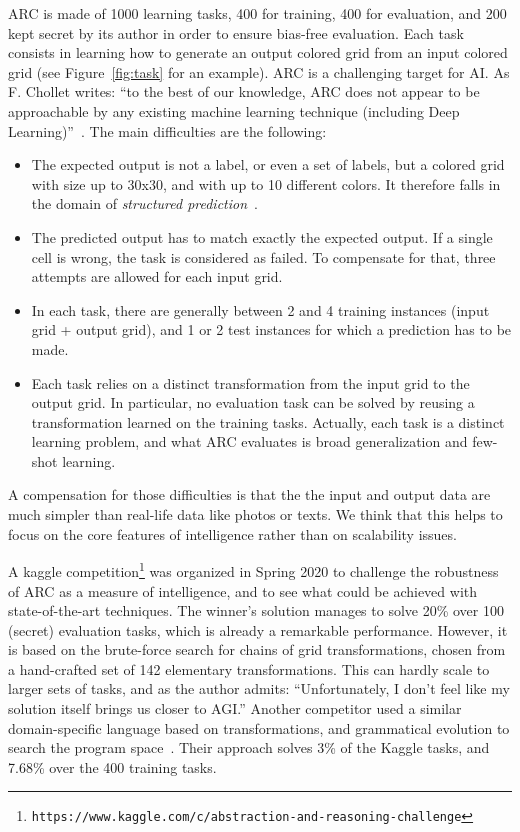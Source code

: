 \documentclass[a4paper]{llncs}
\newcommand{\url}[1]{{\tt #1}}
\begin{document}
ARC is made of 1000 learning tasks, 400 for training, 400 for
evaluation, and 200 kept secret by its author in order to ensure
bias-free evaluation. Each task consists in learning how to generate
an output colored grid from an input colored grid (see
Figure~\ref{fig:task} for an example).
%
ARC is a challenging target for AI. As F. Chollet writes: ``to the
best of our knowledge, ARC does not appear to be approachable by any
existing machine learning technique (including Deep
Learning)''~\cite{Chollet2019}. The main difficulties are the
following:
\begin{itemize}
\item The expected output is not a label, or even a set of labels, but
  a colored grid with size up to 30x30, and with up to 10 different
  colors. It therefore falls in the domain of {\em structured
    prediction}~\cite{dietterich2008structured}.
\item The predicted output has to match exactly the expected
  output. If a single cell is wrong, the task is considered as
  failed. To compensate for that, three attempts are allowed for each
  input grid.
\item In each task, there are generally between 2 and 4 training
  instances (input grid + output grid), and 1 or 2 test instances for
  which a prediction has to be made.
\item Each task relies on a distinct transformation from the input
  grid to the output grid. In particular, no evaluation task can be
  solved by reusing a transformation learned on the training
  tasks. Actually, each task is a distinct learning problem, and what
  ARC evaluates is broad generalization and few-shot learning.
\end{itemize}
A compensation for those difficulties is that the the input and output
data are much simpler than real-life data like photos or texts. We
think that this helps to focus on the core features of intelligence
rather than on scalability issues.

A kaggle
competition\footnote{\url{https://www.kaggle.com/c/abstraction-and-reasoning-challenge}}
was organized in Spring 2020 to challenge the robustness of ARC as a
measure of intelligence, and to see what could be achieved with
state-of-the-art techniques. The winner's solution manages to solve
20\% over 100 (secret) evaluation tasks, which is already a remarkable
performance. However, it is based on the brute-force search for chains
of grid transformations, chosen from a hand-crafted set of 142
elementary transformations. This can hardly scale to larger sets of
tasks, and as the author admits: ``Unfortunately, I don't feel like my
solution itself brings us closer to AGI.'' Another competitor used a
similar domain-specific language based on transformations, and
grammatical evolution to search the program
space~\cite{Fischer2020}. Their approach solves 3\% of the Kaggle
tasks, and 7.68\% over the 400 training tasks.
\end{document}
